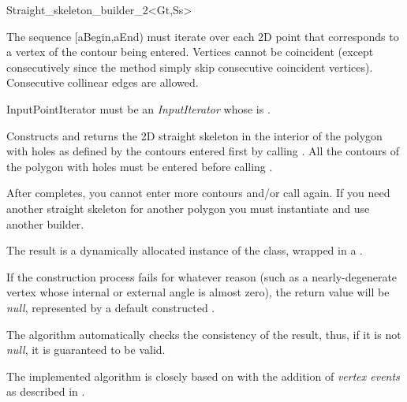 \begin{ccRefClass}{Straight_skeleton_builder_2<Gt,Ss>}
{The sequence [aBegin,aEnd) must iterate over each 2D point that corresponds to a vertex of the contour being entered. Vertices cannot be coincident (except consecutively since the method simply skip consecutive coincident vertices). Consecutive collinear edges are allowed.

InputPointIterator must be an \textit{InputIterator} whose  is .}
   
\ccGlue
{}
{Constructs and returns the 2D straight skeleton in the interior of the polygon with holes as defined by the contours entered first by calling . All the contours of the polygon with holes must be entered before calling .

After  completes, you cannot enter more contours and/or call  again. If you need another straight skeleton for another polygon you must instantiate and use another builder.

The result is a dynamically allocated instance of the  class, wrapped in a .

If the construction process fails for whatever reason (such as a nearly-degenerate vertex whose internal or external angle is almost zero), the return value will be {\em null}, represented by a default constructed .

The algorithm automatically checks the consistency of the result, thus, if it is not {\em null}, it is guaranteed to be valid.
}




The implemented algorithm is closely based on \cite{cgal:fo-ss-98} with the addition of \textit{vertex events} as described in \cite{cgal:ee-rrccpp-98}.


\end{ccRefClass}
